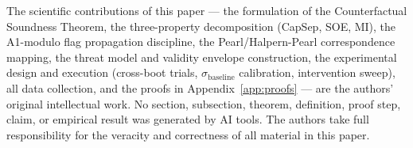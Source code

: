 \documentclass[conference]{IEEEtran}
\newcommand{\sigbase}{\hat{\sigma}_\text{baseline}}
\begin{document}
The scientific contributions of this paper --- the formulation
of the Counterfactual Soundness Theorem, the three-property
decomposition (CapSep, SOE, MI), the A1-modulo flag
propagation discipline, the Pearl/Halpern-Pearl correspondence
mapping, the threat model and validity envelope construction,
the experimental design and execution (cross-boot trials,
$\sigbase$ calibration, intervention sweep), all data
collection, and the proofs in Appendix~\ref{app:proofs} ---
are the authors' original intellectual work. No section,
subsection, theorem, definition, proof step, claim, or
empirical result was generated by AI tools. The authors take
full responsibility for the veracity and correctness of all
material in this paper.
\end{document}
